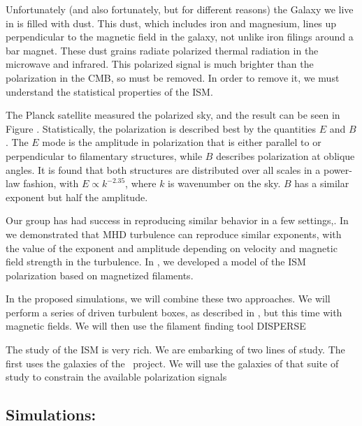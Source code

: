 Unfortunately (and also fortunately, but for different reasons) the Galaxy we live in is filled with dust.
This dust, which includes iron and magnesium, lines up perpendicular to the magnetic
field in the galaxy, not unlike iron filings around a bar magnet.  These dust
grains radiate polarized thermal radiation in the microwave and infrared.  This
polarized signal is much brighter than the polarization in the CMB, so must be
removed.  In order to remove it, we must understand the statistical properties
of the ISM.

The Planck satellite  measured the polarized sky, and the result can be
seen in Figure .  Statistically, the polarization is described best
by the quantities $E$ and $B$.  The $E$ mode is the amplitude in polarization
that is either parallel to or perpendicular to filamentary structures, while $B$
describes polarization at oblique angles.  It is found that both structures are
distributed over all scales in a power-law fashion, with $E \propto k^{-2.35}$,
where $k$ is wavenumber on the sky. $B$ has a similar exponent but half the
amplitude.  


Our group has had success in reproducing similar behavior in a few settings,.
In  we demonstrated that MHD turbulence can reproduce
similar exponents, with the value of the exponent and amplitude depending on
velocity and magnetic field strength in the turbulence.  In
\citet{Huffenberger20}, we developed a model of the ISM polarization based on
magnetized filaments.   

In the proposed simulations, we will combine these two approaches.  We will
perform a series of driven turbulent boxes, as described in , but this
time with magnetic fields.  We will then use the filament finding tool DISPERSE

The study of the ISM is very rich.  We are embarking of two lines of study.  The
first uses the galaxies of the \nameGalaxies\ project.  We will use the galaxies
of that suite of study to constrain the available polarization signals 


\subsection{Simulations: \nameCMB}
\label{subsec.cmb_sims}

